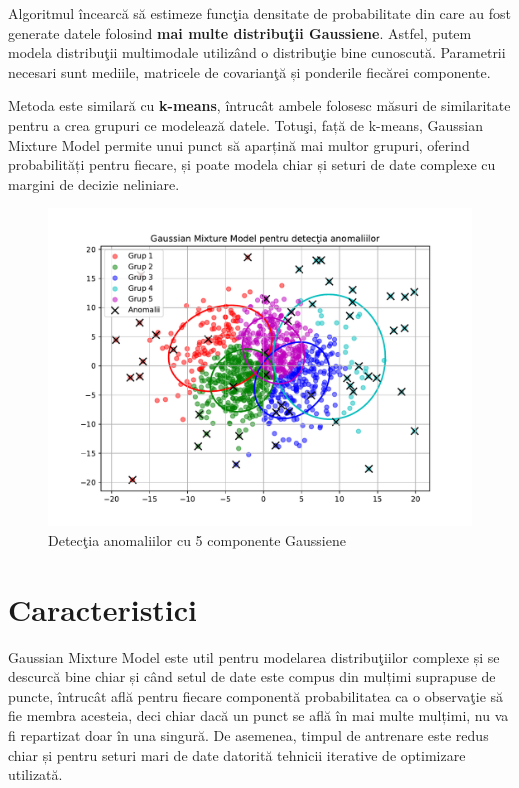 Algoritmul încearcă să estimeze funcţia densitate de probabilitate 
din care au fost generate datele folosind 
\textbf{mai multe distribuţii Gaussiene}.
Astfel, putem modela distribuţii multimodale utilizând o distribuţie bine cunoscută.
Parametrii necesari sunt mediile, matricele de 
covarianţă și ponderile fiecărei componente.

Metoda este similară cu \textbf{k-means}, întrucât ambele folosesc 
măsuri de similaritate pentru a crea grupuri
ce modelează datele. Totuşi, față de k-means,
Gaussian Mixture Model permite unui punct să aparțină 
mai multor grupuri, oferind probabilități pentru fiecare,
și poate modela chiar și seturi de date complexe 
cu margini de decizie neliniare.

\begin{figure}[H]
    \centering
    \includegraphics[width=\linewidth]{images/gmm_anomalies.pdf}
    \caption{Detecţia anomaliilor cu 5 componente Gaussiene}
\end{figure}

\section{Caracteristici}

Gaussian Mixture Model este util pentru modelarea distribuţiilor 
complexe și se descurcă bine chiar și când setul de date 
este compus din mulțimi suprapuse de puncte, întrucât află 
pentru fiecare componentă probabilitatea ca o observaţie
să fie membra acesteia, deci chiar dacă un punct se află 
în mai multe mulțimi, nu va fi repartizat doar în una singură.
De asemenea, timpul de antrenare este redus chiar și pentru 
seturi mari de date datorită tehnicii iterative de optimizare 
utilizată.

